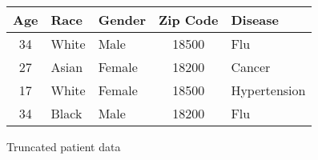 \begin{figure}[H]
    \centering
    \begin{tabular}{c l l c l}
        \toprule
        \textbf{Age} & \textbf{Race} & \textbf{Gender} & \textbf{Zip Code} & \textbf{Disease} \\
        \midrule
        34 & White & Male   & 18500 & Flu \\
        27 & Asian & Female & 18200 & Cancer \\
        17 & White & Female & 18500 & Hypertension \\
        34 & Black & Male   & 18200 & Flu \\
        \bottomrule
    \end{tabular}
    \caption{Truncated patient data}\label{fig:truncated-patient-data}
\end{figure}